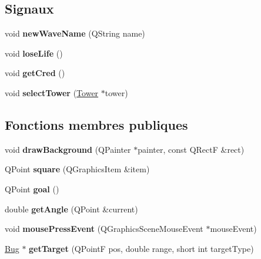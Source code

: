 \subsection*{Signaux}
\begin{DoxyCompactItemize}
\item 
\hypertarget{classRender_a916c15ab4b31cc0f34d9d53b89b89ac0}{
void {\bfseries newWaveName} (QString name)}
\label{classRender_a916c15ab4b31cc0f34d9d53b89b89ac0}

\item 
\hypertarget{classRender_ad88f7f01a7b9fafa756221707d590a78}{
void {\bfseries loseLife} ()}
\label{classRender_ad88f7f01a7b9fafa756221707d590a78}

\item 
\hypertarget{classRender_acd71f1c6c9d67dff3627da4ff6a4c9b8}{
void {\bfseries getCred} ()}
\label{classRender_acd71f1c6c9d67dff3627da4ff6a4c9b8}

\item 
\hypertarget{classRender_a126c4b49e93103a751f66359d8e63171}{
void {\bfseries selectTower} (\hyperlink{classTower}{Tower} $\ast$tower)}
\label{classRender_a126c4b49e93103a751f66359d8e63171}

\end{DoxyCompactItemize}
\subsection*{Fonctions membres publiques}
\begin{DoxyCompactItemize}
\item 
\hypertarget{classRender_aae10ca06c2755038752a2a007727f0ca}{
void {\bfseries drawBackground} (QPainter $\ast$painter, const QRectF \&rect)}
\label{classRender_aae10ca06c2755038752a2a007727f0ca}

\item 
\hypertarget{classRender_a1291eebbb0647502fc90d058bc22e7a3}{
QPoint {\bfseries square} (QGraphicsItem \&item)}
\label{classRender_a1291eebbb0647502fc90d058bc22e7a3}

\item 
\hypertarget{classRender_afd1f727c1514ca01ad1cefbf4992497b}{
QPoint {\bfseries goal} ()}
\label{classRender_afd1f727c1514ca01ad1cefbf4992497b}

\item 
\hypertarget{classRender_a696f385b556f15a7420293a055734e4d}{
double {\bfseries getAngle} (QPoint \&current)}
\label{classRender_a696f385b556f15a7420293a055734e4d}

\item 
\hypertarget{classRender_a899ce19de8a01bb4bc01653cd8761357}{
void {\bfseries mousePressEvent} (QGraphicsSceneMouseEvent $\ast$mouseEvent)}
\label{classRender_a899ce19de8a01bb4bc01653cd8761357}

\item 
\hypertarget{classRender_a8074fc252757d5c446d79f8205348116}{
\hyperlink{classBug}{Bug} $\ast$ {\bfseries getTarget} (QPointF pos, double range, short int targetType)}
\label{classRender_a8074fc252757d5c446d79f8205348116}

\end{DoxyCompactItemize}
